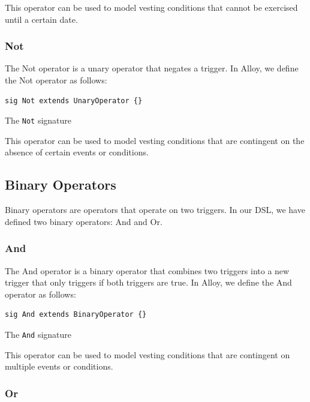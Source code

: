 This operator can be used to model vesting conditions that cannot be exercised until a certain date.

\subsubsection{Not}

The Not operator is a unary operator that negates a trigger. In Alloy, we define the Not operator as follows:

\begin{listing}[!h]
\begin{verbatim}
sig Not extends UnaryOperator {}
\end{verbatim}
\caption{The \texttt{Not} signature}
\label{lst:not-signature}
\end{listing}


This operator can be used to model vesting conditions that are contingent on the absence of certain events or conditions.

\subsection{Binary Operators}

Binary operators are operators that operate on two triggers. In our DSL, we have defined two binary operators: And and Or.

\subsubsection{And}

The And operator is a binary operator that combines two triggers into a new trigger that only triggers if both triggers are true. In Alloy, we define the And operator as follows:

\begin{listing}[!h]
\begin{verbatim}
sig And extends BinaryOperator {}
\end{verbatim}
\caption{The \texttt{And} signature}
\label{lst:and-signature}
\end{listing}


This operator can be used to model vesting conditions that are contingent on multiple events or conditions.

\subsubsection{Or}

